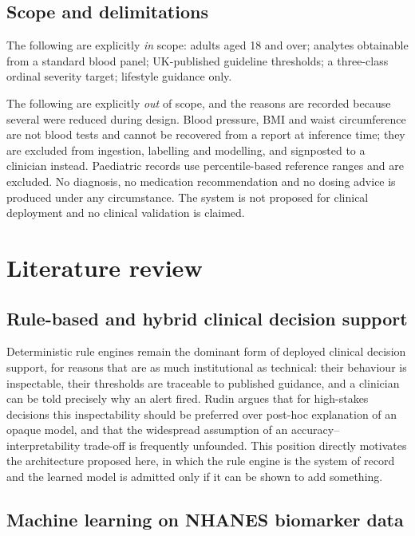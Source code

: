 \documentclass[11pt,a4paper]{article}
\begin{document}
\subsection{Scope and delimitations}

The following are explicitly \emph{in} scope: adults aged 18 and over; analytes
obtainable from a standard blood panel; UK-published guideline thresholds; a
three-class ordinal severity target; lifestyle guidance only.

The following are explicitly \emph{out} of scope, and the reasons are recorded
because several were reduced during design. Blood pressure, BMI and waist
circumference are not blood tests and cannot be recovered from a report at
inference time; they are excluded from ingestion, labelling and modelling, and
signposted to a clinician instead. Paediatric records use percentile-based
reference ranges and are excluded. No diagnosis, no medication recommendation and
no dosing advice is produced under any circumstance. The system is not proposed for
clinical deployment and no clinical validation is claimed.

\section{Literature review}

\subsection{Rule-based and hybrid clinical decision support}

Deterministic rule engines remain the dominant form of deployed clinical decision
support, for reasons that are as much institutional as technical: their behaviour
is inspectable, their thresholds are traceable to published guidance, and a
clinician can be told precisely why an alert fired. Rudin \cite{rudin2019stop}
argues that for high-stakes decisions this inspectability should be preferred over
post-hoc explanation of an opaque model, and that the widespread assumption of an
accuracy--interpretability trade-off is frequently unfounded. This position
directly motivates the architecture proposed here, in which the rule engine is the
system of record and the learned model is admitted only if it can be shown to add
something.

\subsection{Machine learning on NHANES biomarker data}
\end{document}
